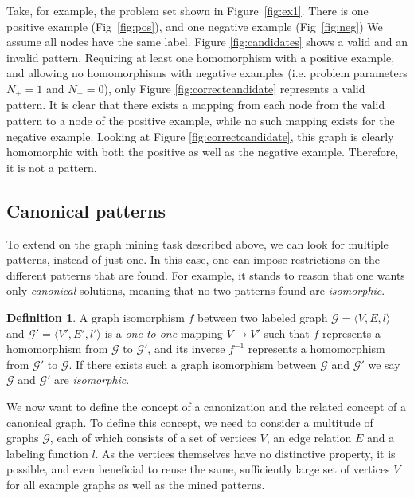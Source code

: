 \documentclass{article}
\theoremstyle{definition}
\newtheorem{definition}{Definition}[section]
\newcommand{\triple}[1]{\ensuremath{\langle #1 \rangle}}
\newcommand{\graph}[1]{\ensuremath{\mathcal{#1}}}
\begin{document}
Take, for example, the problem set shown in Figure~\ref{fig:ex1}.
There is one positive example (Fig~\ref{fig:pos}), and one negative example (Fig~\ref{fig:neg})
We assume all nodes have the same label.
Figure \ref{fig:candidates} shows a valid and an invalid pattern.
Requiring at least one homomorphism with a positive example, and allowing no homomorphisms with negative examples (i.e. problem parameters $N_{+}=1$ and $N_{-}=0$), only Figure \ref{fig:correctcandidate} represents a valid pattern.
It is clear that there exists a mapping from each node from the valid pattern to a node of the positive example, while no such mapping exists for the negative example.
Looking at Figure \ref{fig:correctcandidate}, this graph is clearly homomorphic with both the positive as well as the negative example. Therefore, it is not a pattern.

\subsection{Canonical patterns}
To extend on the graph mining task described above, we can look for multiple patterns, instead of just one.
In this case, one can impose restrictions on the different patterns that are found.
For example, it stands to reason that one wants only \emph{canonical} solutions, meaning that no two patterns found are \emph{isomorphic}.

\begin{definition}
\label{def:isomorphism}
A graph isomorphism $f$ between two labeled graph $\graph{G} = \triple{V,E,l}$ and $\graph{G'} = \triple{V',E',l'}$ is a \emph{one-to-one} mapping $V \rightarrow V'$ 
such that $f$ represents a homomorphism from $\graph{G}$ to $\graph{G'}$,
and its inverse $f^{-1}$ represents a homomorphism from $\graph{G'}$ to $\graph{G}$.
If there exists such a graph isomorphism between $\graph{G}$ and $\graph{G'}$ we say $\graph{G}$ and $\graph{G'}$ are \emph{isomorphic}.
\end{definition}

We now want to define the concept of a canonization and the related concept of a canonical graph. 
To define this concept, we need to consider a multitude of graphs $\graph{G}$, each of which consists of a set of vertices $V$, an edge relation $E$ and a labeling function $l$. 
As the vertices themselves have no distinctive property, it is possible, and even beneficial to reuse the same, sufficiently large set of vertices $V$ for all example graphs as well as the mined patterns.
\end{document}

